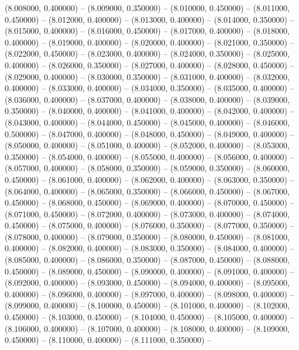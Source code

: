 (8.008000, 0.400000) -- 
(8.009000, 0.350000) -- 
(8.010000, 0.450000) -- 
(8.011000, 0.450000) -- 
(8.012000, 0.400000) -- 
(8.013000, 0.400000) -- 
(8.014000, 0.350000) -- 
(8.015000, 0.400000) -- 
(8.016000, 0.450000) -- 
(8.017000, 0.400000) -- 
(8.018000, 0.400000) -- 
(8.019000, 0.400000) -- 
(8.020000, 0.400000) -- 
(8.021000, 0.350000) -- 
(8.022000, 0.450000) -- 
(8.023000, 0.400000) -- 
(8.024000, 0.350000) -- 
(8.025000, 0.400000) -- 
(8.026000, 0.350000) -- 
(8.027000, 0.400000) -- 
(8.028000, 0.450000) -- 
(8.029000, 0.400000) -- 
(8.030000, 0.350000) -- 
(8.031000, 0.400000) -- 
(8.032000, 0.400000) -- 
(8.033000, 0.400000) -- 
(8.034000, 0.350000) -- 
(8.035000, 0.400000) -- 
(8.036000, 0.400000) -- 
(8.037000, 0.400000) -- 
(8.038000, 0.400000) -- 
(8.039000, 0.350000) -- 
(8.040000, 0.400000) -- 
(8.041000, 0.400000) -- 
(8.042000, 0.400000) -- 
(8.043000, 0.400000) -- 
(8.044000, 0.450000) -- 
(8.045000, 0.400000) -- 
(8.046000, 0.500000) -- 
(8.047000, 0.400000) -- 
(8.048000, 0.450000) -- 
(8.049000, 0.400000) -- 
(8.050000, 0.400000) -- 
(8.051000, 0.400000) -- 
(8.052000, 0.400000) -- 
(8.053000, 0.350000) -- 
(8.054000, 0.400000) -- 
(8.055000, 0.400000) -- 
(8.056000, 0.400000) -- 
(8.057000, 0.400000) -- 
(8.058000, 0.350000) -- 
(8.059000, 0.350000) -- 
(8.060000, 0.450000) -- 
(8.061000, 0.400000) -- 
(8.062000, 0.400000) -- 
(8.063000, 0.350000) -- 
(8.064000, 0.400000) -- 
(8.065000, 0.350000) -- 
(8.066000, 0.450000) -- 
(8.067000, 0.450000) -- 
(8.068000, 0.450000) -- 
(8.069000, 0.400000) -- 
(8.070000, 0.450000) -- 
(8.071000, 0.450000) -- 
(8.072000, 0.400000) -- 
(8.073000, 0.400000) -- 
(8.074000, 0.450000) -- 
(8.075000, 0.400000) -- 
(8.076000, 0.350000) -- 
(8.077000, 0.350000) -- 
(8.078000, 0.400000) -- 
(8.079000, 0.350000) -- 
(8.080000, 0.450000) -- 
(8.081000, 0.400000) -- 
(8.082000, 0.400000) -- 
(8.083000, 0.350000) -- 
(8.084000, 0.400000) -- 
(8.085000, 0.400000) -- 
(8.086000, 0.350000) -- 
(8.087000, 0.450000) -- 
(8.088000, 0.450000) -- 
(8.089000, 0.450000) -- 
(8.090000, 0.400000) -- 
(8.091000, 0.400000) -- 
(8.092000, 0.400000) -- 
(8.093000, 0.450000) -- 
(8.094000, 0.400000) -- 
(8.095000, 0.400000) -- 
(8.096000, 0.400000) -- 
(8.097000, 0.400000) -- 
(8.098000, 0.400000) -- 
(8.099000, 0.400000) -- 
(8.100000, 0.450000) -- 
(8.101000, 0.400000) -- 
(8.102000, 0.450000) -- 
(8.103000, 0.450000) -- 
(8.104000, 0.450000) -- 
(8.105000, 0.400000) -- 
(8.106000, 0.400000) -- 
(8.107000, 0.400000) -- 
(8.108000, 0.400000) -- 
(8.109000, 0.450000) -- 
(8.110000, 0.400000) -- 
(8.111000, 0.350000) -- 

